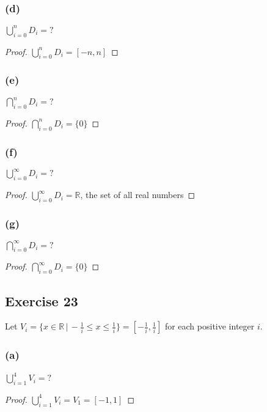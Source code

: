 \documentclass[14pt]{extarticle}
\newcommand{\dps}{\displaystyle}
\newcommand{\R}{\mathbb{R}}
\begin{document}
\subsubsection{(d)}
\(\dps \bigcup_{i=0}^{n}D_i = ?\)

\begin{proof}
  \(\dps \bigcup_{i=0}^{n}D_i = [-n, n]\)
\end{proof}

\subsubsection{(e)}
\(\dps \bigcap_{i=0}^{n}D_i = ?\)

\begin{proof}
  \(\dps \bigcap_{i=0}^{n}D_i = \{0\}\)
\end{proof}

\subsubsection{(f)}
\(\dps \bigcup_{i=0}^{\infty}D_i = ?\)

\begin{proof}
  \(\dps \bigcup_{i=0}^{\infty}D_i = \R\), the set of all real numbers
\end{proof}

\subsubsection{(g)}
\(\dps \bigcap_{i=0}^{\infty}D_i = ?\)

\begin{proof}
  \(\dps \bigcap_{i=0}^{\infty}D_i = \{0\}\)
\end{proof}

\subsection{Exercise 23}
Let \(V_i = \{x \in \R \,|\, -\frac{1}{i} \leq x \leq \frac{1}{i}\} = [-\frac{1}{i}, \frac{1}{i}]\)
for each positive integer $i$.

\subsubsection{(a)}
\(\dps \bigcup_{i=1}^{4}V_i = ?\)

\begin{proof}
  \(\dps \bigcup_{i=1}^{4}V_i = V_1 = [-1, 1]\)
\end{proof}
\end{document}

